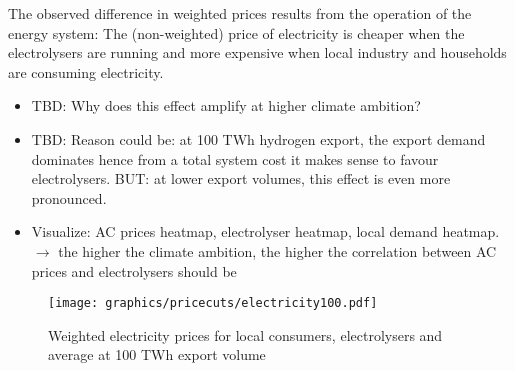 The observed difference in weighted prices results from the operation of the energy system: The (non-weighted) price of electricity is cheaper when the electrolysers are running and more expensive when local industry and households are consuming electricity.
\begin{itemize}
    \item TBD: Why does this effect amplify at higher climate ambition?
    \item TBD: Reason could be: at 100 TWh hydrogen export, the export demand dominates hence from a total system cost it makes sense to favour electrolysers. BUT: at lower export volumes, this effect is even more pronounced.
    \item Visualize: AC prices heatmap, electrolyser heatmap, local demand heatmap. $\rightarrow$ the higher the climate ambition, the higher the correlation between AC prices and electrolysers should be
\end{itemize}



\begin{figure}[h!]
    \centering
    \texttt{[image: graphics/pricecuts/electricity100.pdf]}
    \caption{Weighted electricity prices for local consumers, electrolysers and average at 100 TWh export volume}
    \label{fig:pricecut}
\end{figure}




